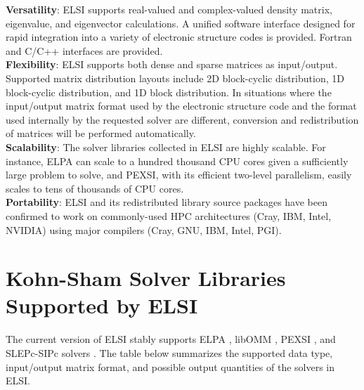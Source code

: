 \documentclass{report}
\begin{document}
\textbf{Versatility}:  ELSI supports real-valued and complex-valued density matrix, eigenvalue, and eigenvector calculations.  A unified software interface designed for rapid integration into a variety of electronic structure codes is provided.  Fortran and C/C++ interfaces are provided.\\

\textbf{Flexibility}:  ELSI supports both dense and sparse matrices as input/output.  Supported matrix distribution layouts include 2D block-cyclic distribution, 1D block-cyclic distribution, and 1D block distribution.  In situations where the input/output matrix format used by the electronic structure code and the format used internally by the requested solver are different, conversion and redistribution of matrices will be performed automatically.\\

\textbf{Scalability}:  The solver libraries collected in ELSI are highly scalable.  For instance, ELPA can scale to a hundred thousand CPU cores given a sufficiently large problem to solve, and PEXSI, with its efficient two-level parallelism, easily scales to tens of thousands of CPU cores.\\

\textbf{Portability}:  ELSI and its redistributed library source packages have been confirmed to work on commonly-used HPC architectures (Cray, IBM, Intel, NVIDIA) using major compilers (Cray, GNU, IBM, Intel, PGI).\\

\section{Kohn-Sham Solver Libraries Supported by ELSI}
\label{sec:solvers}
The current version of ELSI stably supports ELPA \cite{elpa_auckenthaler_2011,elpa_marek_2014}, libOMM \cite{libomm_corsetti_2014}, PEXSI \cite{pexsi_lin_2009,pexsi_lin_2013}, and SLEPc-SIPc solvers \cite{slepc_hernandez_2005,sips_keceli_2016}.  The table below summarizes the supported data type, input/output matrix format, and possible output quantities of the solvers in ELSI.\\
\end{document}
